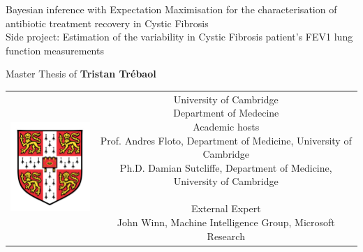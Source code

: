 \begin{titlepage}
\begin{center}
\sffamily


\null
{\Huge Bayesian inference with Expectation \vspace{0.1cm}Maximisation for the characterisation of antibiotic treatment recovery in Cystic Fibrosis} \\[24pt]

\vspace{1cm}
{\huge Side project: Estimation of the variability in Cystic Fibrosis patient's FEV1 lung function measurements} \\[24pt]

\vfill

Master Thesis of \textbf{Tristan Trébaol}\\[9pt]
\vspace{1cm}

\begin{tabular} {cc}
\parbox{0.3\textwidth}{\includegraphics[width=4cm]{images/logocam} \vspace{0.7cm}}
&
\parbox{0.7\textwidth}{%
University of Cambridge\\
  Department of Medecine\\[6pt]

Academic hosts\\[4pt]
%
    Prof. Andres Floto, Department of Medicine, University of Cambridge\\
    Ph.D. Damian Sutcliffe, Department of Medicine, University of Cambridge\\\\
    External Expert\\ John Winn, Machine Intelligence Group, Microsoft Research\\ [12pt]
}
\end{tabular}
\vspace{1cm}


\end{center}
\end{titlepage}
